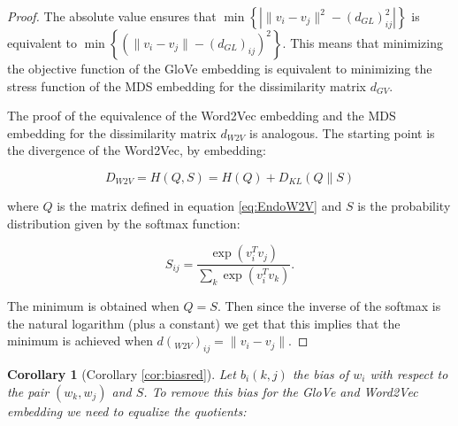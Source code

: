 \documentclass[10pt,a4paper]{elsarticle}
\newtheorem{cor}[theorem]{Corollary}
\begin{document}
{\begin{proof}
		The absolute value ensures that $\min\left\{|\|v_i-v_j\|^{2}- (d_{GL})^{2}_{ij}|\right\}$ is equivalent to $\min\left\{(\|v_i-v_j\|- (d_{GL})_{ij})^{2}\right\}$. This means that minimizing the objective function of the GloVe embedding is equivalent to minimizing the stress function of the MDS embedding for the dissimilarity matrix $d_{GV}$.
		
		The proof of the equivalence of the Word2Vec embedding and the MDS embedding for the dissimilarity matrix $d_{W2V}$ is analogous. The starting point is the divergence of the Word2Vec, by \cite[equation (13)]{pennington2014glove} embedding:
		
		\begin{equation}
			D_{W2V}= H(Q,S)=H(Q)+D_{KL}(Q\| S)
		\end{equation}
		
		where $Q$ is the matrix defined in equation \eqref{eq:EndoW2V} and $S$ is the probability distribution given by the softmax function:
		
		\begin{equation}
			S_{ij}=\frac{\exp(v_i^{T}v_j)}{\sum_{k}\exp(v_{i}^{T}v_k)}.
		\end{equation}
		
		The minimum is obtained when $Q=S$. Then since the inverse of the softmax is the natural logarithm (plus a constant) we get that this implies that the minimum is achieved when $d(_{W2V})_{ij}=\|v_i-v_j\|$.
		
		
		
	\end{proof}
	
	
	\begin{cor}[Corollary \ref{cor:biasred}]\label{cor:biasredA}
		Let  $b_{i}(k,j)$ the bias of $w_{i}$ with respect to the pair $(w_{k},w_{j})$ and $S$. To remove this bias for the GloVe and Word2Vec embedding we need to equalize the quotients:
		

\end{cor}}
\end{document}
